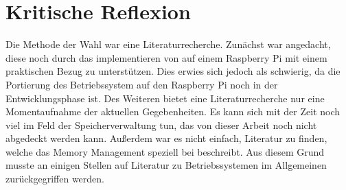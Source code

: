 \section{Kritische Reflexion}
\label{sec:Kritik}
Die Methode der Wahl war eine Literaturrecherche. Zunächst war angedacht, diese noch durch das implementieren von  auf einem Raspberry Pi mit einem praktischen Bezug zu unterstützen. Dies erwies sich jedoch als schwierig, da die Portierung des  Betriebssystem auf den Raspberry Pi noch in der Entwicklungsphase ist. Des Weiteren bietet eine Literaturrecherche nur eine Momentaufnahme der aktuellen Gegebenheiten. Es kann sich mit der Zeit noch viel im Feld der Speicherverwaltung tun, das von dieser Arbeit noch nicht abgedeckt werden kann. Außerdem war es nicht einfach, Literatur zu finden, welche das Memory Management speziell bei  beschreibt. Aus diesem Grund musste an einigen Stellen auf Literatur zu Betriebssystemen im Allgemeinen zurückgegriffen werden.
